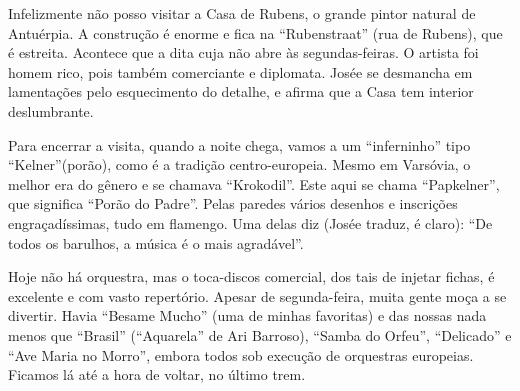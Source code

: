 Infelizmente não posso visitar a Casa de Rubens, o grande pintor natural de Antuérpia. A construção é enorme e fica na ``Rubenstraat'' (rua de Rubens), que é estreita. Acontece que a dita cuja não abre às segundas-feiras. O artista foi homem rico, pois também comerciante e diplomata. Josée se desmancha em lamentações pelo esquecimento do detalhe, e afirma que a Casa tem interior deslumbrante.

Para encerrar a visita, quando a noite chega, vamos a um ``inferninho'' tipo ``Kelner''(porão), como é a tradição centro-europeia. Mesmo em Varsóvia, o melhor era do gênero e se chamava ``Krokodil''. Este aqui se chama ``Papkelner'', que significa ``Porão do Padre''. Pelas paredes vários desenhos e inscrições engraçadíssimas, tudo em flamengo. Uma delas diz (Josée traduz, é claro): ``De todos os barulhos, a música é o mais agradável''.

Hoje não há orquestra, mas o toca-discos comercial, dos tais de injetar fichas, é excelente e com vasto repertório. Apesar de segunda-feira, muita gente moça a se divertir. Havia ``Besame Mucho'' (uma de minhas favoritas) e das nossas nada menos que ``Brasil'' (``Aquarela'' de Ari Barroso), ``Samba do Orfeu'', ``Delicado'' e ``Ave Maria no Morro'', embora todos sob execução de orquestras europeias. Ficamos lá até a hora de voltar, no último trem.
